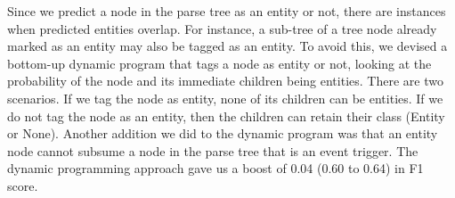 \begin{enumerate}
 Since we predict a node in the parse tree as an entity or not, there are instances when predicted entities overlap. For instance, a sub-tree of a tree node already marked as an entity may also be tagged as an entity. To avoid this, we devised a bottom-up dynamic program that tags a node as entity or not, looking at the probability of the node and its immediate children being entities. There are two scenarios. If we tag the node as entity, none of its children can be entities. If we do not tag the node as an entity, then the children can retain their class (Entity or None). Another addition we did to the dynamic program was that an entity node cannot subsume a node in the parse tree that is an event trigger. The dynamic programming approach gave us a boost of 0.04 (0.60 to 0.64) in F1 score. 

\end{enumerate}